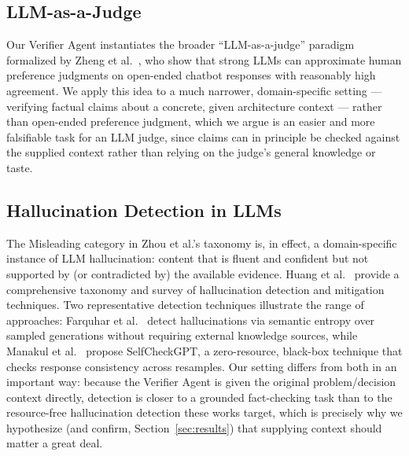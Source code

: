 \documentclass[runningheads]{llncs}
\begin{document}
\subsection{LLM-as-a-Judge}
Our Verifier Agent instantiates the broader ``LLM-as-a-judge'' paradigm formalized by Zheng et al.\ \cite{zheng2023judging}, who show that strong LLMs can approximate human preference judgments on open-ended chatbot responses with reasonably high agreement. We apply this idea to a much narrower, domain-specific setting --- verifying factual claims about a concrete, given architecture context --- rather than open-ended preference judgment, which we argue is an easier and more falsifiable task for an LLM judge, since claims can in principle be checked against the supplied context rather than relying on the judge's general knowledge or taste.

\subsection{Hallucination Detection in LLMs}
The Misleading category in Zhou et al.'s taxonomy is, in effect, a domain-specific instance of LLM hallucination: content that is fluent and confident but not supported by (or contradicted by) the available evidence. Huang et al.\ \cite{huang2025survey} provide a comprehensive taxonomy and survey of hallucination detection and mitigation techniques. Two representative detection techniques illustrate the range of approaches: Farquhar et al.\ \cite{farquhar2024semantic} detect hallucinations via semantic entropy over sampled generations without requiring external knowledge sources, while Manakul et al.\ \cite{manakul2023selfcheckgpt} propose SelfCheckGPT, a zero-resource, black-box technique that checks response consistency across resamples. Our setting differs from both in an important way: because the Verifier Agent is given the original problem/decision context directly, detection is closer to a grounded fact-checking task than to the resource-free hallucination detection these works target, which is precisely why we hypothesize (and confirm, Section~\ref{sec:results}) that supplying context should matter a great deal.
\end{document}
